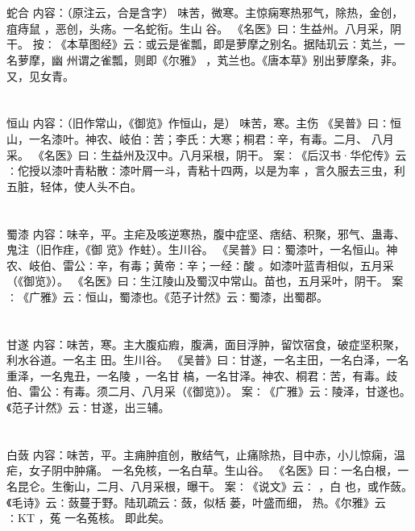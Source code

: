 \documentclass[12pt,UTF8]{ctexbook}
\begin{document}
\section{}蛇合
内容：（原注云，合是含字） 
味苦，微寒。主惊痫寒热邪气，除热，金创，疽痔鼠 ，恶创，头疡。一名蛇衔。生山 
谷。 
《名医》曰∶生益州。八月采，阴干。 
按∶《本草图经》云∶或云是雀瓢，即是萝摩之别名。据陆玑云∶芄兰，一名萝摩，幽 
州谓之雀瓢，则即《尔雅》 ，芄兰也。《唐本草》别出萝摩条，非。又，见女青。 


\section{}恒山
内容：（旧作常山，《御览》作恒山，是） 
味苦，寒。主伤 
《吴普》曰∶恒山，一名漆叶。神农、岐伯∶苦；李氏∶大寒；桐君∶辛，有毒。二月、 
八月采。 
《名医》曰∶生益州及汉中。八月采根，阴干。 
案∶《后汉书·华佗传》云∶佗授以漆叶青粘散∶漆叶屑一斗，青粘十四两，以是为率 
，言久服去三虫，利五脏，轻体，使人头不白。 


\section{}蜀漆
内容：味辛，平。主疟及咳逆寒热，腹中症坚、痞结、积聚，邪气、蛊毒、鬼注（旧作疰，《御 
览》作蛀）。生川谷。 
《吴普》曰∶蜀漆叶，一名恒山。神农、岐伯、雷公∶辛，有毒；黄帝∶辛；一经∶酸 
。如漆叶蓝青相似，五月采（《御览》）。 
《名医》曰∶生江陵山及蜀汉中常山。苗也，五月采叶，阴干。 
案∶《广雅》云∶恒山，蜀漆也。《范子计然》云∶蜀漆，出蜀郡。 


\section{}甘遂
内容：味苦，寒。主大腹疝瘕，腹满，面目浮肿，留饮宿食，破症坚积聚，利水谷道。一名主 
田。生川谷。 
《吴普》曰∶甘遂，一名主田，一名白泽，一名重泽，一名鬼丑，一名陵 ，一名甘 
槁，一名甘泽。神农、桐君∶苦，有毒。歧伯、雷公∶有毒。须二月、八月采（《御览》）。 
案∶《广雅》云∶陵泽，甘遂也。《范子计然》云∶甘遂，出三辅。 


\section{}白蔹
内容：味苦，平。主痈肿疽创，散结气，止痛除热，目中赤，小儿惊痫，温疟，女子阴中肿痛。 
一名免核，一名白草。生山谷。 
《名医》曰∶一名白根，一名昆仑。生衡山，二月、八月采根，曝干。 
案∶《说文》云∶ ，白 也，或作蔹。《毛诗》云∶蔹蔓于野。陆玑疏云∶蔹，似栝 
蒌，叶盛而细， 
热。《尔雅》云∶KT ，菟 
一名菟核。 
即此矣。 
\end{document}
